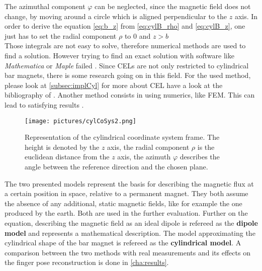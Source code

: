 The azimuthal component $ \varphi $ can be neglected, since the magnetic field does not change, by moving around a circle which is aligned perpendicular to the $ z $ axis. In order to derive the equation \ref{eq:b_z} from \ref{eq:cylB_rho} and \ref{eq:cylB_z}, one just has to set the radial component $ \rho $ to 0 and $ z > b $\\
Those integrals are not easy to solve, therefore numerical methods are used to find a solution. However trying to find an exact solution with software like \textit{Mathematica} or \textit{Maple} failed \cite{camacho2013alternative}. Since \acp{CEL} are not only restricted to cylindrical bar magnets, there is some research going on in this field. For the used method, please look at \ref{subsec:implCyl} for more about \ac{CEL} have a look at the bibliography of \cite{derby2010cylindrical}. Another method consists in using numerics, like \ac{FEM}. This can lead to satisfying results \cite{mladenovic2009magnetic}.

\begin{figure}
\centering
\texttt{[image: pictures/cylCoSys2.png]}
\caption{Representation of the cylindrical coordinate system frame. The height is denoted by the $ z $ axis, the radial component $ \rho $ is the euclidean distance from the $ z $ axis, the azimuth $ \varphi $ describes the angle between the reference direction and the chosen plane. \cite{derby2010cylindrical}}
\label{fig:cylCoSys}
\end{figure}

The two presented models represent the basis for describing the magnetic flux at a certain position in space, relative to a permanent magnet. They both assume the absence of any additional, static magnetic fields, like for example the one produced by the earth. Both are used in the further evaluation. Further on the equation, describing the magnetic field as an ideal dipole is refereed as the \textbf{dipole model} and represents a  mathematical description. The model approximating the cylindrical shape of the bar magnet is refereed as the \textbf{cylindrical model}. A comparison between the two methods with real measurements and its effects on the finger pose reconstruction is done in \ref{cha:results}.

